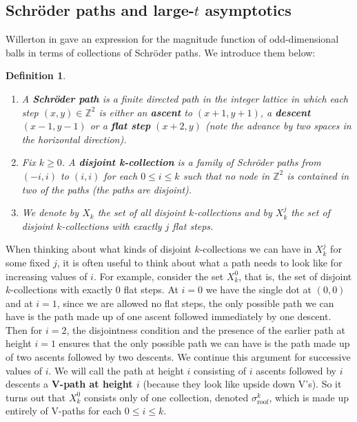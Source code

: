 \documentclass[11pt]{article}
\newcommand{\Z}{\mathbb{Z}}
\theoremstyle{mythm}
\newtheorem{defn}{Definition}[section]
\begin{document}
\subsection{Schröder paths and large-$t$ asymptotics}

Willerton in \cite{willerton_magnitude_2017} gave an expression for the magnitude function of odd-dimensional balls in terms of collections of Schröder paths. We introduce them below:
\begin{defn}
\begin{enumerate}[label=$\bullet$]
\item A \textbf{Schröder path} is a finite directed path in the integer lattice in which each step $(x,y)\in\Z^2$ is either an \textbf{ascent} to $(x+1,y+1)$, a \textbf{descent} $(x-1,y-1)$ or a \textbf{flat step} $(x+2,y)$ (note the advance by \emph{two} spaces in the horizontal direction).
\item Fix $k\geq0$. A \textbf{disjoint k-collection} is a family of Schröder paths from $(-i,i)$ to $(i,i)$ for each $0\leq i\leq k$ such that no node in $\Z^2$ is contained in two of the paths (the paths are disjoint).
\item We denote by $X_k$ the set of all disjoint $k$-collections and by $X_k^j$ the set of disjoint $k$-collections with exactly $j$ flat steps.
\end{enumerate}
\end{defn}

When thinking about what kinds of disjoint $k$-collections we can have in $X_k^j$ for some fixed $j$, it is often useful to think about what a path needs to look like for increasing values of $i$. For example, consider the set $X_k^0$, that is, the set of disjoint $k$-collections with exactly 0 flat steps. At $i = 0$ we have the single dot at $(0,0)$ and at $i = 1$, since we are allowed no flat steps, the only possible path we can have is the path made up of one ascent followed immediately by one descent. Then for $i = 2$, the disjointness condition and the presence of the earlier path at height $i=1$ ensures that the only possible path we can have is the path made up of two ascents followed by two descents. We continue this argument for successive values of $i$. We will call the path at height $i$ consisting of $i$ ascents followed by $i$ descents a \textbf{V-path at height $i$} (because they look like upside down V's). So it turns out that $X_k^0$ consists only of one collection, denoted $\sigma_{\text{roof}}^k$, which is made up entirely of V-paths for each $0\leq i\leq k$.
\end{document}

